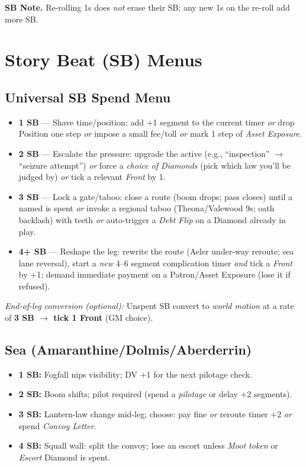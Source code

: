 \documentclass[11pt,letterpaper,twoside]{book}
\begin{document}
\noindent\textbf{SB Note.} Re-rolling 1s does \emph{not} erase their SB; any new 1s on the re-roll add more SB.

\section{Story Beat (SB) Menus}

\subsection{Universal SB Spend Menu}
\begin{itemize}
  \item \textbf{1 SB} --- Shave time/position: add +1 segment to the current timer \emph{or} drop Position one step \emph{or} impose a small fee/toll \emph{or} mark 1 step of \emph{Asset Exposure}.
  \item \textbf{2 SB} --- Escalate the pressure: upgrade the active \SuitClub{} (e.g., ``inspection'' $\rightarrow$ ``seizure attempt'') \emph{or} force a \emph{choice of Diamonds} (pick which law you'll be judged by) \emph{or} tick a relevant \emph{Front} by 1.
  \item \textbf{3 SB} --- Lock a gate/taboo: close a route (boom drops; pass closes) until a named \SuitDiamond{} is spent \emph{or} invoke a regional taboo (Theona/Valewood 9s; oath backlash) with teeth \emph{or} auto-trigger a \emph{Debt Flip} on a Diamond already in play.
  \item \textbf{4+ SB} --- Reshape the leg: rewrite the route (Aeler under-way reroute; sea lane reversal), start a \emph{new} 4--6 segment complication timer \emph{and} tick a \emph{Front} by +1; demand immediate payment on a Patron/Asset Exposure (lose it if refused).
\end{itemize}
\textit{End-of-leg conversion (optional):} Unspent SB convert to \emph{world motion} at a rate of \textbf{3 SB $\rightarrow$ tick 1 Front} (GM choice).

\subsection{Sea (Amaranthine/Dolmis/Aberderrin)}
\begin{itemize}
  \item \textbf{1 SB:} Fogfall nips visibility; DV +1 for the next pilotage check.
  \item \textbf{2 SB:} Boom shifts; pilot required (spend a \emph{pilotage} \SuitDiamond{} or delay +2 segments).
  \item \textbf{3 SB:} Lantern-law change mid-leg; choose: pay fine \emph{or} reroute timer +2 \emph{or} spend \emph{Convoy Letter}.
  \item \textbf{4 SB:} Squall wall: split the convoy; lose an escort unless \emph{Moot token} or \emph{Escort} Diamond is spent.
\end{itemize}
\end{document}
